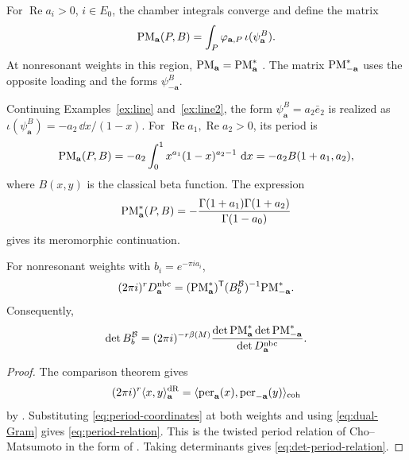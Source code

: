 For $\operatorname{Re}a_i>0$, $i\in E_0$, the chamber integrals
converge and define the matrix
\[
 \mathrm{PM}_{\mathbf a}(P,B)
 =\int_P\varphi_{\mathbf a,P}\,\iota(\psi_{\mathbf a}^B).
\]
At nonresonant weights in this region, $\mathrm{PM}_{\mathbf a}=\mathrm{PM}^*_{\mathbf a}$
\cite[Remark 3.3.3]{DouaiTerao1997}.
The matrix $\mathrm{PM}^*_{-\mathbf a}$ uses the opposite loading
and the forms $\psi_{-\mathbf a}^B$.

\begin{example}\label{ex:line3}
Continuing Examples~\ref{ex:line} and~\ref{ex:line2}, the form
$\psi^B_{\mathbf a}=a_2\bar e_2$ is realized as
$\iota(\psi^B_{\mathbf a})=-a_2\,\dd x/(1-x)$.
For $\operatorname{Re}a_1,\operatorname{Re}a_2>0$, its period is
\[
 \mathrm{PM}_{\mathbf a}(P,B)
 =-a_2\int_0^1 x^{a_1}(1-x)^{a_2-1}\,\mathop{}\!\mathrm d x
 =-a_2 B(1+a_1,a_2),
\]
where $B(x,y)$ is the classical beta function. The expression
\[
 \mathrm{PM}_{\mathbf a}^*(P,B)
 =-\frac{\Gamma(1+a_1)\Gamma(1+a_2)}{\Gamma(1-a_0)}
\]
gives its meromorphic continuation.
\end{example}


\begin{proposition}\label{prop:period-relation}
For nonresonant weights with $b_i=e^{-\pi i a_i}$,
\begin{equation}\label{eq:period-relation}
 (2\pi i)^rD_{\mathbf a}^{\mathrm{nbc}}
 =(\mathrm{PM}^*_{\mathbf a})^{\mathsf T}(B_b^{\mathcal B})^{-1}\mathrm{PM}^*_{-\mathbf a}.
\end{equation}
Consequently,
\begin{equation}\label{eq:det-period-relation}
 \det B_b^{\mathcal B}=(2\pi i)^{-r\beta(M)}
       \frac{\det\mathrm{PM}^*_{\mathbf a}\det\mathrm{PM}^*_{-\mathbf a}}
            {\det D_{\mathbf a}^{\mathrm{nbc}}}.
\end{equation}
\end{proposition}
\begin{proof}
The comparison theorem gives
\[
 (2\pi i)^r\langle x,y\rangle^{\mathrm{dR}}_{\mathbf a}
 =\langle\operatorname{per}_{\mathbf a}(x),\operatorname{per}_{-\mathbf a}(y)\rangle_{\mathrm{coh}}
\]
by \cite[equation (15.1)]{Lam}. Substituting
\eqref{eq:period-coordinates} at both weights and using
\eqref{eq:dual-Gram} gives \eqref{eq:period-relation}.
This is the twisted period relation of Cho--Matsumoto
\cite{ChoMatsumoto1995} in the form of
\cite[equation (15.2)]{Lam}. Taking determinants gives
\eqref{eq:det-period-relation}.
\end{proof}

